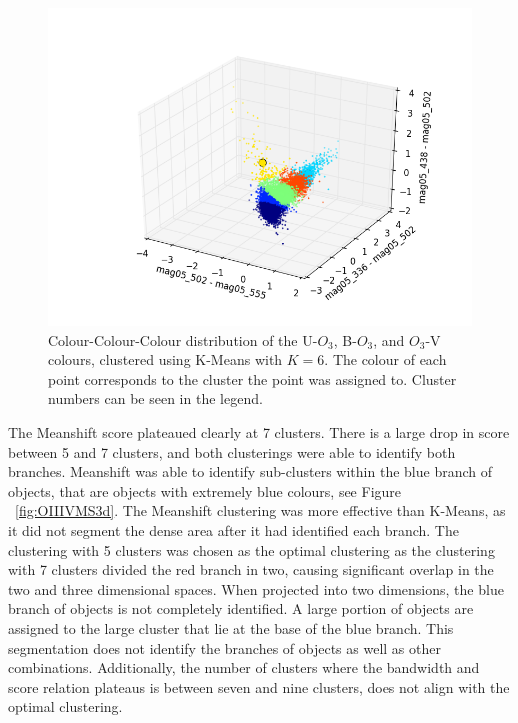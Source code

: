 \begin{figure}
\centering
\includegraphics[width=\linewidth]{figs/kmeans_3d_color_6cl_mag05_502-mag05_555vsmag05_336-mag05_502vsmag05_438-mag05_502}
\caption{Colour-Colour-Colour distribution of the U-$O_{3}$, B-$O_{3}$, and $O_{3}$-V colours, clustered using K-Means with $K=6$. The colour of each point corresponds to the cluster the point was assigned to. Cluster numbers can be seen in the legend.}
\label{fig:fig:OIIIVKM3d}
\end{figure}

The Meanshift score plateaued clearly at 7 clusters. There is a large drop in score between 5 and 7 clusters, and both clusterings were able to identify both branches.
Meanshift was able to identify sub-clusters within the blue branch of objects, that are objects with extremely blue colours, see Figure ~\ref{fig:OIIIVMS3d}.
The Meanshift clustering was more effective than K-Means, as it did not segment the dense area after it had identified each branch.
The clustering with 5 clusters was chosen as the optimal clustering as the clustering with 7 clusters divided the red branch in two, causing significant overlap in the two and three dimensional spaces.
When projected into two dimensions, the blue branch of objects is not completely identified.
A large portion of objects are assigned to the large cluster that lie at the base of the blue branch.
This segmentation does not identify the branches of objects as well as other combinations.
Additionally, the number of clusters where the bandwidth and score relation plateaus is between seven and nine clusters, does not align with the optimal clustering.

